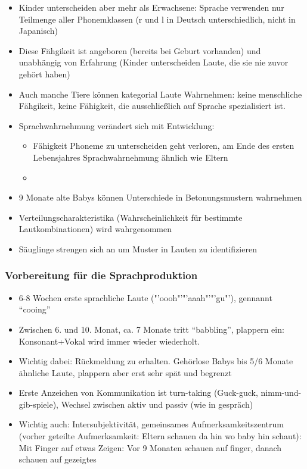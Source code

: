\begin{itemize}
	\item
		Kinder unterscheiden aber mehr als Erwachsene: Sprache verwenden nur Teilmenge aller Phonemklassen (r und l in Deutsch unterschiedlich, nicht in Japanisch)
	\item
		Diese Fähgikeit ist angeboren (bereits bei Geburt vorhanden) und unabhängig von Erfahrung (Kinder unterscheiden Laute, die sie nie zuvor gehört haben)
	\item
		Auch manche Tiere können kategorial Laute Wahrnehmen: keine menschliche Fähgikeit, keine Fähigkeit, die ausschließlich auf Sprache spezialisiert ist.
	\item
		Sprachwahrnehmung verändert sich mit Entwicklung:
		\begin{itemize}
			\item
				Fähigkeit Phoneme zu unterscheiden geht verloren, am Ende des ersten Lebensjahres Sprachwahrnehmung ähnlich wie Eltern
			\item
		\end{itemize}
	\item
	 9 Monate alte Babys können Unterschiede in Betonungsmustern wahrnehmen
 \item
	 Verteilungscharakteristika (Wahrscheinlichkeit für bestimmte Lautkombinationen) wird wahrgenommen
 \item
	 Säuglinge strengen sich an um Muster in Lauten zu identifizieren
\end{itemize}
\subsubsection{Vorbereitung für die Sprachproduktion}
\begin{itemize}
	\item
		6-8 Wochen erste sprachliche Laute ("'oooh"'"'aaah"'"'gu"'), gennannt \enquote{cooing}
	\item
		Zwischen 6. und 10. Monat, ca. 7 Monate tritt \enquote{babbling}, plappern ein: Konsonant+Vokal wird immer wieder wiederholt.
	\item
		Wichtig dabei: Rückmeldung zu erhalten. Gehörlose Babys bis 5/6 Monate  ähnliche Laute, plappern aber erst sehr spät und begrenzt
	\item
		Erste Anzeichen von Kommunikation ist turn-taking (Guck-guck, nimm-und-gib-spiele), Wechsel zwischen aktiv und passiv (wie in gespräch)
	\item
		Wichtig auch: Intersubjektivität, gemeinsames Aufmerksamkeitszentrum (vorher geteilte Aufmerksamkeit: Eltern schauen da hin wo baby hin schaut): Mit Finger auf etwas Zeigen: Vor 9 Monaten schauen auf finger, danach schauen auf gezeigtes
\end{itemize}
